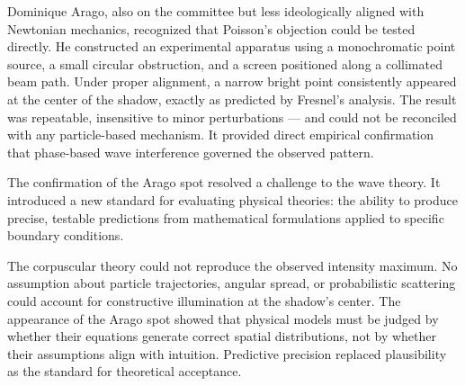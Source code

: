 Dominique Arago, also on the committee but less ideologically aligned with Newtonian mechanics, recognized that Poisson's objection could be tested directly. He constructed an experimental apparatus using a monochromatic point source, a small circular obstruction, and a screen positioned along a collimated beam path. Under proper alignment, a narrow bright point consistently appeared at the center of the shadow, exactly as predicted by Fresnel's analysis. The result was repeatable, insensitive to minor perturbations — and could not be reconciled with any particle-based mechanism. It provided direct empirical confirmation that phase-based wave interference governed the observed pattern.

The confirmation of the Arago spot resolved a challenge to the wave theory. It introduced a new standard for evaluating physical theories: the ability to produce precise, testable predictions from mathematical formulations applied to specific boundary conditions.

The corpuscular theory could not reproduce the observed intensity maximum. No assumption about particle trajectories, angular spread, or probabilistic scattering could account for constructive illumination at the shadow's center. The appearance of the Arago spot showed that physical models must be judged by whether their equations generate correct spatial distributions, not by whether their assumptions align with intuition. Predictive precision replaced plausibility as the standard for theoretical acceptance.

